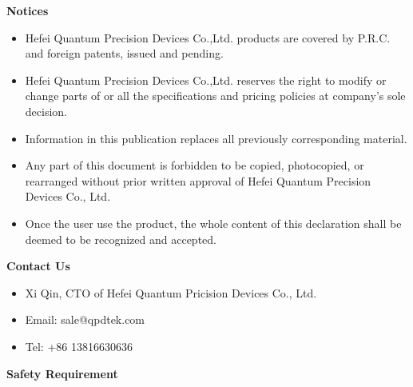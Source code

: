 \vspace{0.8cm}
\sihao\textbf{Notices}
\begin{itemize}
 \item Hefei Quantum Precision Devices Co.,Ltd. products are covered by P.R.C. and foreign patents, issued and pending.
 \item Hefei Quantum Precision Devices Co.,Ltd. reserves the right to modify or change parts of or all the specifications and pricing policies at company's sole decision.
 \item Information in this publication replaces all previously corresponding material.
 \item Any part of this document is forbidden to be copied, photocopied, or rearranged without prior written approval of Hefei Quantum Precision Devices Co., Ltd.
 \item Once the user use the product, the whole content of this declaration shall be deemed to be recognized and accepted.
\end{itemize}

\vspace{0.6cm}

\sihao\textbf{Contact Us}
\begin{itemize}
 \item Xi Qin, CTO of Hefei Quantum Pricision Devices Co., Ltd.
 \item Email: sale@qpdtek.com
 \item Tel:  +86 13816630636
\end{itemize}


\newpage
\erhao \textbf{Safety Requirement}
\vspace{1.1cm}

